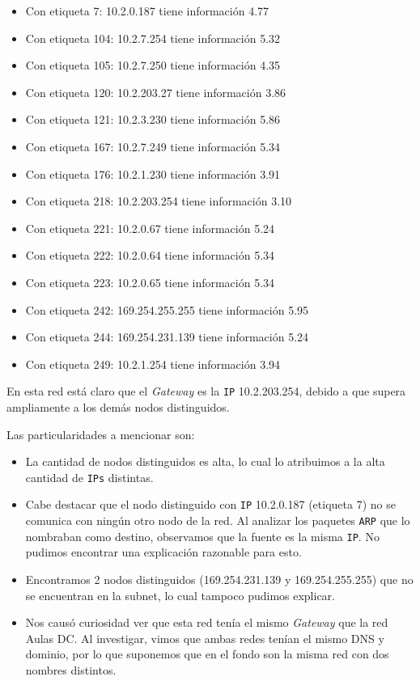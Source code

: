 \begin{itemize}
    \item Con etiqueta 7: 10.2.0.187 tiene información 4.77
    \item Con etiqueta 104: 10.2.7.254 tiene información 5.32
    \item Con etiqueta 105: 10.2.7.250 tiene información 4.35
    \item Con etiqueta 120: 10.2.203.27 tiene información 3.86
    \item Con etiqueta 121: 10.2.3.230 tiene información 5.86
    \item Con etiqueta 167: 10.2.7.249 tiene información 5.34
    \item Con etiqueta 176: 10.2.1.230 tiene información 3.91
    \item Con etiqueta 218: 10.2.203.254 tiene información 3.10
    \item Con etiqueta 221: 10.2.0.67 tiene información 5.24
    \item Con etiqueta 222: 10.2.0.64 tiene información 5.34
    \item Con etiqueta 223: 10.2.0.65 tiene información 5.34
    \item Con etiqueta 242: 169.254.255.255 tiene información 5.95
    \item Con etiqueta 244: 169.254.231.139 tiene información 5.24
    \item Con etiqueta 249: 10.2.1.254 tiene información 3.94

\end{itemize}

En esta red está claro que el \textit{Gateway} es la \texttt{IP} 10.2.203.254, debido a que
supera ampliamente a los demás nodos distinguidos.

Las particularidades a mencionar son:
\begin{itemize}
    \item La cantidad de nodos distinguidos es alta, lo cual lo atribuimos a la alta
        cantidad de \texttt{IPs} distintas.
    \item Cabe destacar que el nodo distinguido con \texttt{IP} 10.2.0.187 (etiqueta 7)
        no se comunica con ningún otro nodo de la red. Al analizar los paquetes \texttt{ARP} que lo nombraban como
        destino, observamos que la fuente es la misma \texttt{IP}. No pudimos encontrar una explicación razonable para
        esto.
    \item Encontramos 2 nodos distinguidos (169.254.231.139 y 169.254.255.255) que no
        se encuentran en la subnet, lo cual tampoco pudimos explicar.
    \item Nos causó curiosidad ver que esta red tenía el mismo \textit{Gateway} que la red
        Aulas DC. Al investigar, vimos que ambas redes tenían el mismo DNS y dominio, por lo que suponemos
        que en el fondo son la misma red con dos nombres distintos.
\end{itemize}

